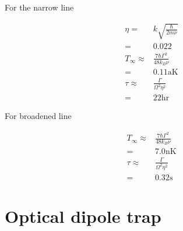 \documentclass[10pt,fleqn]{article}
\newcommand{\eqar}[1]
{
  \begin{align*}
    #1
  \end{align*}
}
\begin{document}
\subsection{}
For the narrow line
\eqar{
  \eta=&k\sqrt{\frac{\hbar}{2m\nu}}\\
  =&0.022\\
  T_\infty\approx&\frac{7\hbar\Gamma^2}{48k_B\nu}\\
  =&0.11\text{aK}\\
  \tau\approx&\frac{\Gamma}{\Omega^2\eta^2}\\
  =&22\text{hr}
}
For broadened line
\eqar{
  T_\infty\approx&\frac{7\hbar\Gamma^2}{48k_B\nu}\\
  =&7.0\text{nK}\\
  \tau\approx&\frac{\Gamma}{\Omega^2\eta^2}\\
  =&0.32\text{s}
}

\section{Optical dipole trap}
\subsection{}
\subsection{}
\subsection{}
\end{document}
